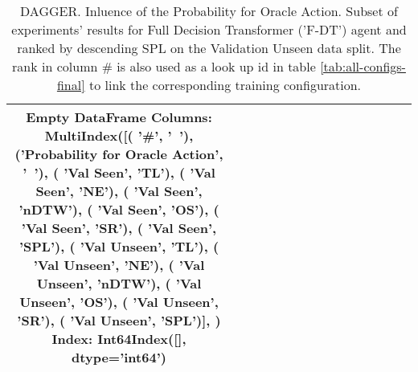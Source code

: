 \begin{table}
\centering
\caption{\label{tab:f_dt_dagger_prob}DAGGER. Inluence of the Probability for Oracle Action. Subset of experiments' results for Full Decision Transformer ('F-DT') agent and ranked by descending SPL on the Validation Unseen data split. The rank in column \# is also used as a look up id in table \ref{tab:all-configs-final} to link the corresponding training configuration.}
\begin{tabular}{@{\hskip3pt}c@{\hskip3pt}c@{\hskip3pt}c@{\hskip3pt}c@{\hskip3pt}c@{\hskip3pt}c@{\hskip3pt}c@{\hskip3pt}c@{\hskip3pt}c@{\hskip3pt}c@{\hskip3pt}c@{\hskip3pt}c@{\hskip3pt}c@{\hskip3pt}c@{\hskip3pt}c}
\toprule
Empty DataFrame
Columns: MultiIndex([(                           '\textbf{\#}',    '\textbf{~}'),
            ('\textbf{Probability for Oracle Action}',    '\textbf{~}'),
            (                     '\textbf{Val Seen}',   '\textbf{TL}'),
            (                     '\textbf{Val Seen}',   '\textbf{NE}'),
            (                     '\textbf{Val Seen}', '\textbf{nDTW}'),
            (                     '\textbf{Val Seen}',   '\textbf{OS}'),
            (                     '\textbf{Val Seen}',   '\textbf{SR}'),
            (                     '\textbf{Val Seen}',  '\textbf{SPL}'),
            (                   '\textbf{Val Unseen}',   '\textbf{TL}'),
            (                   '\textbf{Val Unseen}',   '\textbf{NE}'),
            (                   '\textbf{Val Unseen}', '\textbf{nDTW}'),
            (                   '\textbf{Val Unseen}',   '\textbf{OS}'),
            (                   '\textbf{Val Unseen}',   '\textbf{SR}'),
            (                   '\textbf{Val Unseen}',  '\textbf{SPL}')],
           )
Index: Int64Index([], dtype='int64') \\
\bottomrule
\end{tabular}
\end{table}
